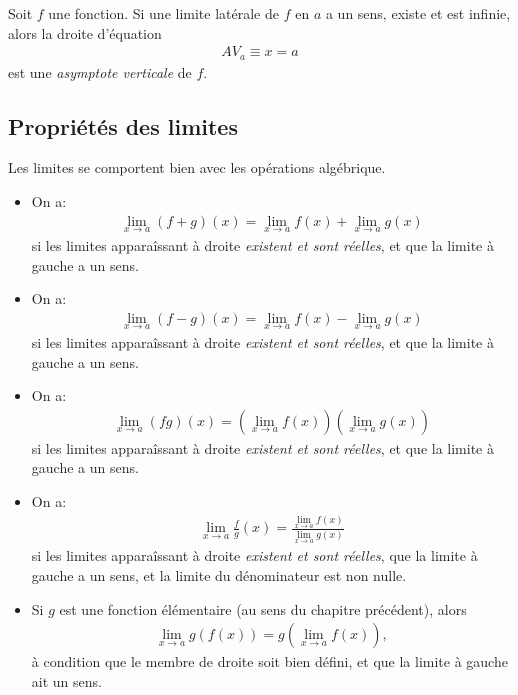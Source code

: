 \documentclass[main.tex]{subfiles}
\begin{document}
\begin{definition}

    Soit $f$ une fonction.
    Si une limite latérale de $f$ en $a$ a un sens, existe et est infinie,
    alors la droite d'équation
    \begin{align}
        AV_a \equiv x = a
    \end{align}
    est une \emph{asymptote verticale} de $f$.
\end{definition}

\subsection{Propriétés des limites}

Les limites se comportent bien avec les opérations algébrique.

\begin{howto}

    \begin{itemize}
        \item On a:
            \begin{align}
                \lim_{x \to a} (f + g)(x) = \lim_{x \to a} f(x) + \lim_{x \to a} g(x)
            \end{align}
            si les limites apparaîssant à droite \emph{existent et sont réelles},
            et que la limite à gauche a un sens.
        \item On a:
            \begin{align}
                \lim_{x \to a} (f - g)(x) = \lim_{x \to a} f(x) - \lim_{x \to a} g(x)
            \end{align}
            si les limites apparaîssant à droite \emph{existent et sont réelles},
            et que la limite à gauche a un sens.
        \item On a:
            \begin{align}
                \lim_{x \to a} (f g)(x) = \left(\lim_{x \to a} f(x)\right) \left(\lim_{x \to a} g(x)\right)
            \end{align}
            si les limites apparaîssant à droite \emph{existent et sont réelles},
            et que la limite à gauche a un sens.
        \item On a:
            \begin{align}
                \lim_{x \to a} \frac f g(x) = \frac {\lim_{x \to a} f(x)} {\lim_{x \to a} g(x)}
            \end{align}
            si les limites apparaîssant à droite \emph{existent et sont réelles},
            que la limite à gauche a un sens,
            et la limite du dénominateur est non nulle.
        \item Si $g$ est une fonction élémentaire (au sens du chapitre précédent),
            alors
            \begin{align*}
                \lim_{x \to a} g(f(x)) = g(\lim_{x \to a} f(x)),
            \end{align*}
            à condition que le membre de droite soit bien défini,
            et que la limite à gauche ait un sens.
    \end{itemize}
\end{howto}
\end{document}
